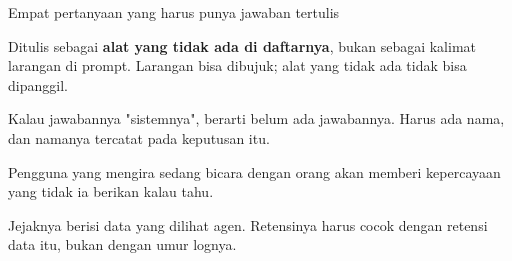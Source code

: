 \documentclass[aspectratio=169,11pt,t]{beamer}
\begin{document}
\begin{frame}[shrink=25]{Empat pertanyaan yang harus punya jawaban tertulis}
\begin{minipage}[t]{0.494\textwidth}
\begin{icardaccent}
Ditulis sebagai \textbf{alat yang tidak ada di daftarnya}, bukan sebagai kalimat larangan di prompt. Larangan bisa dibujuk; alat yang tidak ada tidak bisa dipanggil.
\end{icardaccent}
\end{minipage}%
\hfill
\begin{minipage}[t]{0.494\textwidth}
\begin{icard}
Kalau jawabannya "sistemnya", berarti belum ada jawabannya. Harus ada nama, dan namanya tercatat pada keputusan itu.
\end{icard}
\end{minipage}%


\vskip 4pt

\begin{minipage}[t]{0.494\textwidth}
\begin{icard}
Pengguna yang mengira sedang bicara dengan orang akan memberi kepercayaan yang tidak ia berikan kalau tahu.
\end{icard}
\end{minipage}%
\hfill
\begin{minipage}[t]{0.494\textwidth}
\begin{icard}
Jejaknya berisi data yang dilihat agen. Retensinya harus cocok dengan retensi data itu, bukan dengan umur lognya.
\end{icard}
\end{minipage}%
\end{frame}
\end{document}

